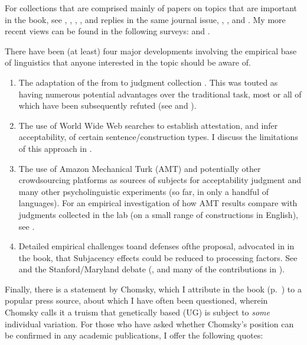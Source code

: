 \begin{refsection}
For collections that are comprised mainly of papers on topics that are important in the book, see \citet{McNair1996}, \citet{Penke2004}, \citet{Kepser2005}, \citet{Borsley2005}, \citet{Featherston2007} and replies in the same journal issue, \citet{Featherston2007a}, \citet{Featherston2009}, and \citet{Winkler2009}. My more recent views can be found in the following surveys: \citet{Schuetze2006,Schuetze2011} and \citet{Schuetze2013}.

There have been (at least) four major developments involving the empirical base of linguistics that anyone interested in the topic should be aware of. 
    
\begin{enumerate}
\item The adaptation of the  from  to judgment collection \citep{BardEtAl1996}. This was touted as having numerous potential advantages over the traditional  task, most or all of which have been subsequently refuted (see \citealt{Weskott2011} and \citealt{Sprouse2013}). 
\item The use of World Wide Web searches to establish attestation, and infer acceptability, of certain sentence/construction types. I discuss the limitations of this approach in \citet{Schuetze2009}.
\item The use of Amazon Mechanical Turk (AMT) and potentially other crowdsourcing platforms as sources of subjects for acceptability judgment and many other psycholinguistic experiments (so far, in only a handful of languages). For an empirical investigation of how AMT results compare with judgments collected in the lab (on a small range of constructions in English), see \citet{Sprouse2011}.
\item Detailed empirical challenges to\schdash{}and defenses of\schdash{}the proposal, advocated in  in the book, that Subjacency effects could be reduced to processing factors. See \citet{Yoshida2014} and the Stanford/Maryland debate (\citet{Hofmeister2010,Hofmeister2012,Hofmeister2012a,Sprouse2012,Sprouse2012a}, and many of the contributions in \citealt{Sprouse2014}).
\end{enumerate}
 
Finally, there is a statement by Chomsky, which I attribute in the book (p.~\pageref{ChomskyPrefacestart}) to a popular press source, about which I have often been questioned, wherein Chomsky calls it a truism that genetically based  (UG) is subject to \textit{some} individual variation. For those who have asked whether Chomsky’s position can be confirmed in any academic publications, I offer the following quotes:


\end{refsection}
